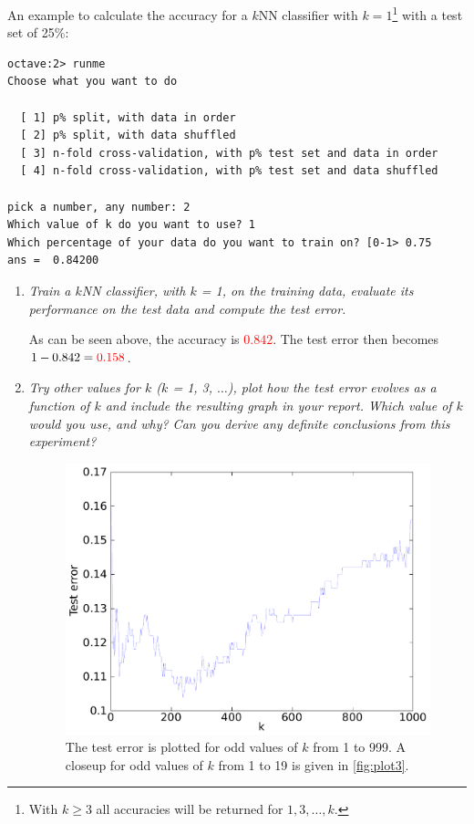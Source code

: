 \documentclass[a4paper,11pt]{article}
\newcommand{\highlightColor}{red}
\begin{document}
An example to calculate the accuracy for a $k$NN classifier with $k = 1$\footnote{With $k \ge 3$ all accuracies will be returned for $1, 3, \ldots, k$.}
with a test set of 25\%: 
\begin{verbatim}
octave:2> runme
Choose what you want to do

  [ 1] p% split, with data in order
  [ 2] p% split, with data shuffled
  [ 3] n-fold cross-validation, with p% test set and data in order
  [ 4] n-fold cross-validation, with p% test set and data shuffled

pick a number, any number: 2
Which value of k do you want to use? 1
Which percentage of your data do you want to train on? [0-1> 0.75
ans =  0.84200
\end{verbatim}

\begin{enumerate}
\item \textit{Train a $k$NN classifier, with $k$ = 1, on the training data, evaluate its performance on the test data and
compute the test error.}

As can be seen above, the accuracy is \textcolor{\highlightColor}{$0.842$}.  The test error then becomes $1 - 0.842 = \textcolor{\highlightColor}{0.158}$.  

\item \textit{Try other values for $k$ ($k$ = 1, 3, $\ldots$), plot how the test error evolves as a function of $k$ and include the
resulting graph in your report.  Which value of $k$ would you use, and why? Can you derive any definite
conclusions from this experiment?
}

\begin{figure}[t]
  \begin{center}
    \caption{The test error is plotted for odd values of $k$ from 1 to 999.  A closeup for odd values of $k$ from 1 to 19 is given in \autoref{fig:plot3}.}
    \label{fig:plot2}
    \includegraphics[width=0.6\paperwidth]{plot2.pdf}
  \end{center}
\end{figure}


\end{enumerate}
\end{document}
